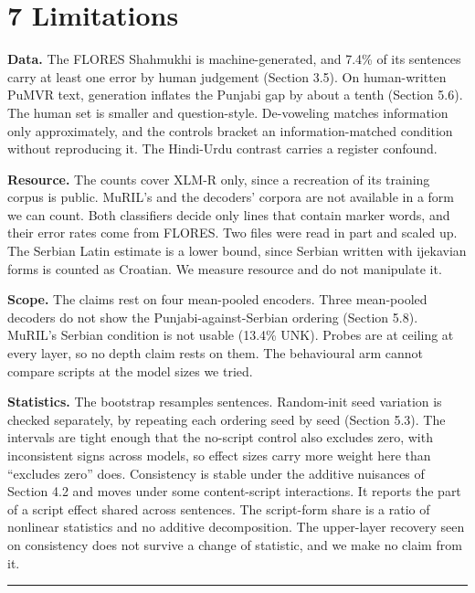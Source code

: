 \hypertarget{limitations}{%
\section{7 Limitations}\label{limitations}}

\textbf{Data.} The FLORES Shahmukhi is machine-generated, and 7.4\% of
its sentences carry at least one error by human judgement (Section 3.5).
On human-written PuMVR text, generation inflates the Punjabi gap by
about a tenth (Section 5.6). The human set is smaller and
question-style. De-voweling matches information only approximately, and
the controls bracket an information-matched condition without
reproducing it. The Hindi-Urdu contrast carries a register confound.

\textbf{Resource.} The counts cover XLM-R only, since a recreation of
its training corpus is public. MuRIL's and the decoders' corpora are not
available in a form we can count. Both classifiers decide only lines
that contain marker words, and their error rates come from FLORES. Two
files were read in part and scaled up. The Serbian Latin estimate is a
lower bound, since Serbian written with ijekavian forms is counted as
Croatian. We measure resource and do not manipulate it.

\textbf{Scope.} The claims rest on four mean-pooled encoders. Three
mean-pooled decoders do not show the Punjabi-against-Serbian ordering
(Section 5.8). MuRIL's Serbian condition is not usable (13.4\% UNK).
Probes are at ceiling at every layer, so no depth claim rests on them.
The behavioural arm cannot compare scripts at the model sizes we tried.

\textbf{Statistics.} The bootstrap resamples sentences. Random-init seed
variation is checked separately, by repeating each ordering seed by seed
(Section 5.3). The intervals are tight enough that the no-script control
also excludes zero, with inconsistent signs across models, so effect
sizes carry more weight here than ``excludes zero'' does. Consistency is
stable under the additive nuisances of Section 4.2 and moves under some
content-script interactions. It reports the part of a script effect
shared across sentences. The script-form share is a ratio of nonlinear
statistics and no additive decomposition. The upper-layer recovery seen
on consistency does not survive a change of statistic, and we make no
claim from it.

\begin{center}\rule{0.5\linewidth}{0.5pt}\end{center}

